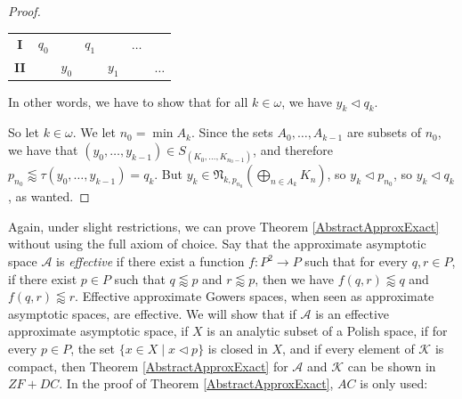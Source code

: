 \documentclass[a4paper,11pt]{article}
\theoremstyle{definition}
\numberwithin{equation}{section}
\newcommand{\X}{\mathcal{X}}
\newcommand{\A}{\mathcal{A}}
\newcommand{\K}{\mathcal{K}}
\begin{document}
\begin{proof}
\smallskip

\begin{tabular}{ccccccc}
\textbf{I} & $q_0$ & & $q_1$ & & $\hdots$ & \\
\textbf{II} & & $y_0$ & & $y_1$ & & $\hdots$ 
\end{tabular}

\smallskip

\noindent In other words, we have to show that for all $k \in \omega$, we have $y_k \vartriangleleft q_k$.

\smallskip

So let $k \in \omega$. We let $n_0 = \min A_k$. Since the sets $A_0, \ldots, A_{k - 1}$ \nolinebreak are subsets of $n_0$, we have that $(y_0, \ldots, y_{k - 1}) \in S_{(K_0, \ldots, K_{n_0 - 1})}$, and therefore $p_{n_0} \lessapprox \tau(y_0, \ldots, y_{k - 1}) = q_k$.
But $y_k \in \mathfrak{N}_{k, p_{n_0}}\left(\bigoplus_{n \in A_k} K_n\right)$, so $y_k \vartriangleleft p_{n_0}$, so $y_k \vartriangleleft q_k$, as wanted.
\end{proof}


Again, under slight restrictions, we can prove Theorem \ref{AbstractApproxExact} without using the full axiom of choice. Say that the approximate asymptotic space $\mathcal{A}$ is \emph{effective} if %
there exist a function $f : P^2 \longrightarrow P$ such that for every $q, r \in P$, if there exist $p \in P$ such that $q \lessapprox p$ and $r \lessapprox p$, then we have $f(q, r) \lessapprox q$ and $f(q, r) \lessapprox r$. Effective approximate Gowers spaces, when seen as approximate asymptotic spaces, are effective. We will show that if $\A$ is an effective approximate asymptotic space, if $X$ is an analytic subset of a Polish space, if for every $p \in P$, the set $\{x \in X \mid x \vartriangleleft p\}$ is closed in $X$, and if every element of $\K$ is compact, then Theorem \ref{AbstractApproxExact} for $\mathcal{A}$ and $\K$ can be shown in $ZF + DC$. In the proof of Theorem \ref{AbstractApproxExact}, $AC$ is only used: 
\end{document}
